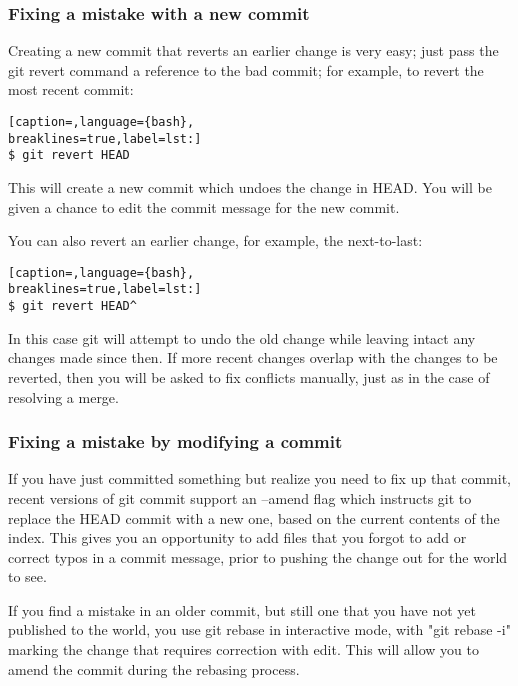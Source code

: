 \subsubsection{Fixing a mistake with a new commit}
Creating a new commit that reverts an earlier change is very easy; just pass
the git revert command a reference to the bad commit; for example, to revert
the most recent commit:
\lstset{basicstyle=\scriptsize, numbers=none, captionpos=b, tabsize=4}
\begin{lstlisting}[caption=,language={bash},
breaklines=true,label=lst:]
$ git revert HEAD
\end{lstlisting}

This will create a new commit which undoes the change in HEAD. You will be
given a chance to edit the commit message for the new commit.

You can also revert an earlier change, for example, the next-to-last:
\lstset{basicstyle=\scriptsize, numbers=none, captionpos=b, tabsize=4}
\begin{lstlisting}[caption=,language={bash},
breaklines=true,label=lst:]
$ git revert HEAD^
\end{lstlisting}

In this case git will attempt to undo the old change while leaving intact any
changes made since then. If more recent changes overlap with the changes to be
reverted, then you will be asked to fix conflicts manually, just as in the case
of resolving a merge.

\subsubsection{Fixing a mistake by modifying a commit}
If you have just committed something but realize you need to fix up that
commit, recent versions of git commit support an --amend flag which instructs
git to replace the HEAD commit with a new one, based on the current contents of
the index. This gives you an opportunity to add files that you forgot to add or
correct typos in a commit message, prior to pushing the change out for the
world to see.

If you find a mistake in an older commit, but still one that you have not yet
published to the world, you use git rebase in interactive mode, with "git
rebase -i" marking the change that requires correction with edit. This will
allow you to amend the commit during the rebasing process.
